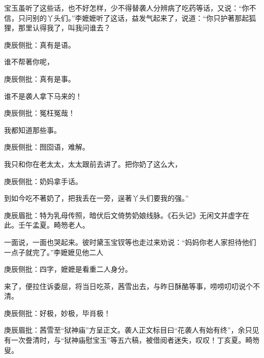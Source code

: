 \begin{parag}

    宝玉虽听了这些话，也不好怎样，少不得替袭人分辨病了吃药等话，又说：“你不信，只问别的丫头们。”李嬷嬷听了这话，益发气起来了，说道：“你只护著那起狐狸，那里认得我了，叫我问谁去？\begin{note}庚辰侧批：真有是语。\end{note}谁不帮著你呢，\begin{note}庚辰侧批：真有是事。\end{note}谁不是袭人拿下马来的！\begin{note}庚辰侧批：冤枉冤哉！\end{note}我都知道那些事。\begin{note}庚辰侧批：囫囵语，难解。\end{note}我只和你在老太太，太太跟前去讲了。把你奶了这么大，\begin{note}庚辰侧批：奶妈拿手话。\end{note}到如今吃不著奶了，把我丢在一旁，逞著丫头们要我的强。”\begin{note}庚辰眉批：特为乳母传照，暗伏后文倚势奶娘线脉。《石头记》无闲文并虚字在此。壬午孟夏。畸笏老人。\end{note}一面说，一面也哭起来。彼时黛玉宝钗等也走过来劝说：“妈妈你老人家担待他们一点子就完了。”李嬷嬷见他二人\begin{note}庚辰侧批：四字，嬷嬷是看重二人身分。\end{note}来了，便拉住诉委屈，将当日吃茶，茜雪出去，与昨日酥酪等事，唠唠叨叨说个不清。\begin{note}庚辰侧批：好极，妙极，毕肖极！\end{note}\begin{note}庚辰眉批：茜雪至“狱神庙”方呈正文。袭人正文标目曰“花袭人有始有终”，余只见有一次誊清时，与“狱神庙慰宝玉”等五六稿，被借阅者迷失，叹叹！丁亥夏。畸笏叟。\end{note}
\end{parag}


